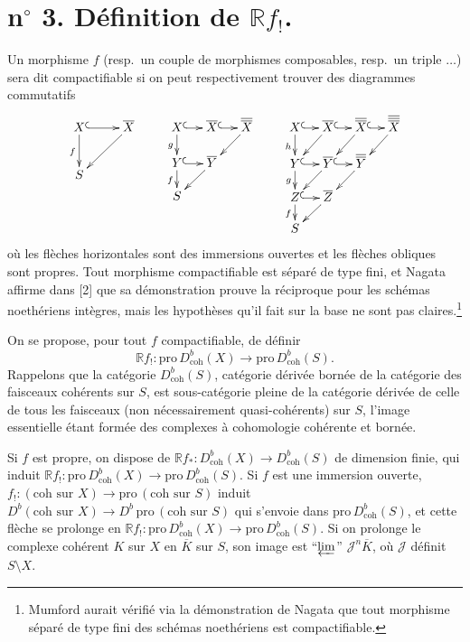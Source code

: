 \documentclass[12pt]{amsart}
\theoremstyle{plain}
\theoremstyle{definition}
\newcommand{\Pro}{\text{pro}\,}
\newcommand{\coh}{\text{coh}}
\newcommand{\cJ}{\mathcal{J}}
\newcommand{\cDb}{D^{b}}
\newcommand{\bR}{\mathbb{R}}
\begin{document}
\section*{n$^{\circ}$ 3. D\'efinition de $\bR f_{!}$.}

Un morphisme $f$ (resp.\ un couple de morphismes composables, resp.\ un triple $\ldots$) sera dit compactifiable si on peut respectivement trouver des diagrammes commutatifs
\[
\xymatrix{
X \ar@{^{(}->}[r] \ar[d]_{f} & \overline{X} \ar[dl] \\
S &
}
\qquad
\xymatrix@C=1.25em@R=1.25em{
X \ar@{^{(}->}[r] \ar[d]_{g} & \overline{X} \ar@{^{(}->}[r] & \overline{\overline{X}} \ar[dl] \\
Y \ar@{^{(}->}[r] \ar[d]_{f} & \overline{Y} \ar[dl] \\
S &&
}
\qquad
\xymatrix@C=1.1em@R=1.1em{
X \ar@{^{(}->}[r] \ar[d]_{h} & \overline{X} \ar@{^{(}->}[r] \ar[dl] & \overline{\overline{X}} \ar@{^{(}->}[r] \ar[dl] & \overline{\overline{\overline{X}}} \ar[dl] \\
Y \ar@{^{(}->}[r] \ar[d]_{g} & \overline{Y} \ar@{^{(}->}[r] \ar[dl] & \overline{\overline{Y}} \ar[dl] & \\
Z \ar@{^{(}->}[r] \ar[d]_{f} & \overline{Z} \ar[dl] & & \\
S & & &
}
\]
o\`u les fl\`eches horizontales sont des immersions ouvertes et les fl\`eches obliques sont propres. Tout morphisme compactifiable est s\'epar\'e de type fini, et Nagata affirme dans [2] que sa d\'emonstration prouve la r\'eciproque pour les sch\'emas noeth\'eriens int\`egres, mais les hypoth\`eses qu'il fait sur la base ne sont pas claires.\footnote{Mumford aurait v\'erifi\'e via la d\'emonstration de Nagata que tout morphisme s\'epar\'e de type fini des sch\'emas noeth\'eriens est compactifiable.}

On se propose, pour tout $f$ compactifiable, de d\'efinir
\[
\bR f_{!}: \Pro\cDb_{\coh}(X) \longrightarrow \Pro\cDb_{\coh}(S).
\]
Rappelons que la cat\'egorie $\cDb_{\coh}(S)$, cat\'egorie d\'eriv\'ee born\'ee de la cat\'egorie des faisceaux coh\'erents sur $S$, est sous-cat\'egorie pleine de la cat\'egorie d\'eriv\'ee de celle de tous les faisceaux (non n\'ecessairement quasi-coh\'erents) sur $S$, l'image essentielle \'etant form\'ee des complexes \`a cohomologie coh\'erente et born\'ee.

Si $f$ est propre, on dispose de $\bR f_{*}: \cDb_{\coh}(X) \to \cDb_{\coh}(S)$ de dimension finie, qui induit $\bR f_{!}: \Pro\cDb_{\coh}(X) \to \Pro\cDb_{\coh}(S)$. Si $f$ est une immersion ouverte, $f_{!}: (\text{coh sur } X) \to \Pro(\text{coh sur } S)$ induit $\cDb(\text{coh sur } X) \to \cDb\,\Pro(\text{coh sur } S)$ qui s'envoie dans $\Pro\cDb_{\coh}(S)$, et cette fl\`eche se prolonge en $\bR f_{!}: \Pro\cDb_{\coh}(X) \to \Pro\cDb_{\coh}(S)$. Si on prolonge le complexe coh\'erent $K$ sur $X$ en $\overline{K}$ sur $S$, son image est ``$\varprojlim$'' $\cJ^{n}\overline{K}$, o\`u $\cJ$ d\'efinit $S \setminus X$.
\end{document}
